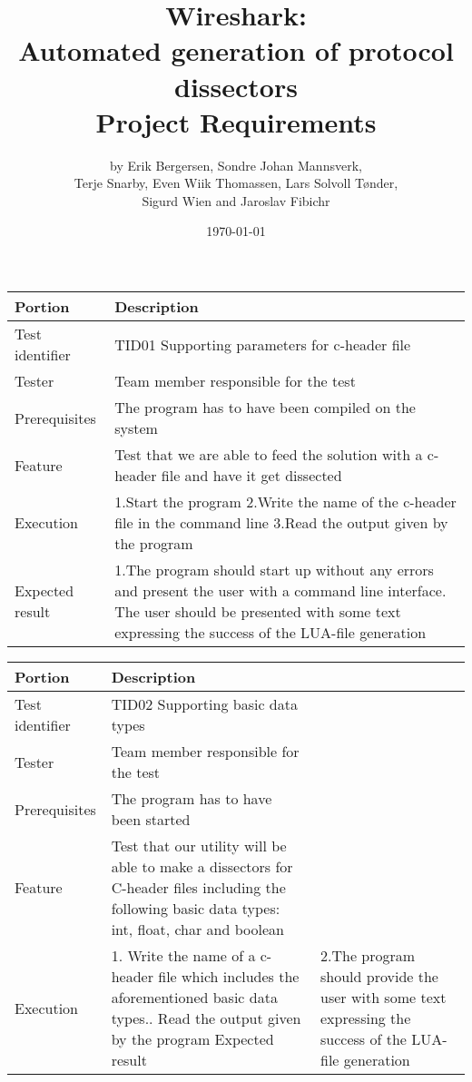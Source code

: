 \documentclass[a4paper, 11pt]{report}
\title{Wireshark:\\ Automated generation of protocol dissectors\\
		Project Requirements}
\author{by Erik Bergersen, Sondre Johan Mannsverk,\\ Terje Snarby,
		Even Wiik Thomassen, Lars Solvoll Tønder,\\ Sigurd Wien
		and Jaroslav Fibichr}
\date{\today}
\begin{document}
\begin{table}[H]
\begin{tabularx}{\textwidth}{l X}
\hline\hline
Portion & Description\\[0.5ex]
\hline
Test identifier & TID01 Supporting parameters for c-header file\\[0.5ex]
Tester & Team member responsible for the test\\[0.5ex]
Prerequisites & The program has to have been compiled on the system\\[0.5ex]
Feature & Test that we are able to feed the solution with a c-header file and have it get dissected\\
Execution & 1.Start the program\newline
		2.Write the name of the c-header file in the command line\newline
		 3.Read the output given by the program\\ 
Expected result & 1.The program should start up without any errors and present the user with a command line interface\newline
3. The user should be presented with some text expressing the success of the LUA-file generation\\[0.5ex]
\hline\hline
\end{tabularx}


\begin{tabularx}{\textwidth}{l X}
\hline\hline
Portion & Description\\[0.5ex]
\hline
Test identifier & TID02 Supporting basic data types\\[0.5ex]
Tester & Team member responsible for the test\\[0.5ex]
Prerequisites & The program has to have been started\\[0.5ex]
Feature & Test that our utility will be able to make a dissectors for C-header files including the following basic data types: int, float, char and boolean \\
Execution & 1. Write the name of a c-header file which includes the aforementioned basic data types.. Read the output given by the program 
Expected result & 2.The program should provide the user with some text expressing the success of the LUA-file generation\\[0.5ex]
\hline\hline
\end{tabularx}



\end{table}
\end{document}
